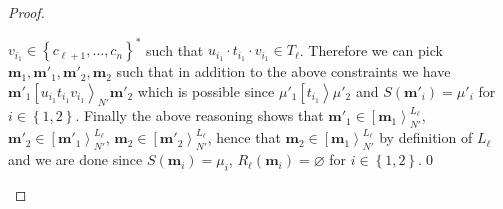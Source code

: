 \documentclass{fsttcs}
\def\set#1{{\left\{ #1 \right\}}}
\def\mmap{\mathbf{m}}
\newcommand{\fire}[1]{\left[ {#1}\right\rangle}
\begin{document}
\begin{proof}
\begin{itemize}
  \(v_{i_1}\in\set{c_{\ell+1},\ldots,c_n}^*\) such that \(u_{i_1}\cdot t_{i_1}\cdot v_{i_1}\in T_{\ell}\).
  Therefore we can pick \(\mmap_1,\mmap'_1,\mmap'_2,\mmap_2\) such that
  in addition to the above constraints we have
  \(\mmap'_1\fire{u_{i_1}t_{i_1}v_{i_1}}_{N'}\mmap'_2\)
  which is possible since \(\mu'_1\fire{t_{i_1}}\mu'_2\) and
  \(S(\mmap'_i)=\mu'_i\) for \(i\in\set{1,2}\). Finally the above reasoning
  shows that 
  \(\mmap'_1\in\fire{\mmap_1}^{L_{\ell}}_{N'}\),
  \(\mmap'_2\in \fire{\mmap'_1}^{L_{\ell}}_{N'}\),
  \(\mmap_2\in\fire{\mmap'_2}^{L_{\ell}}_{N'}\), hence that
  \(\mmap_2\in\fire{\mmap_1}^{L_{\ell}}_{N'}\) by definition of \(L_{\ell}\) and we are done
  since $S(\mmap_i)=\mu_i$, $R_{\ell}(\mmap_i)=\varnothing$ for \(i\in\set{1,2}\).\qed
\end{itemize}
\end{proof}
\end{document}
